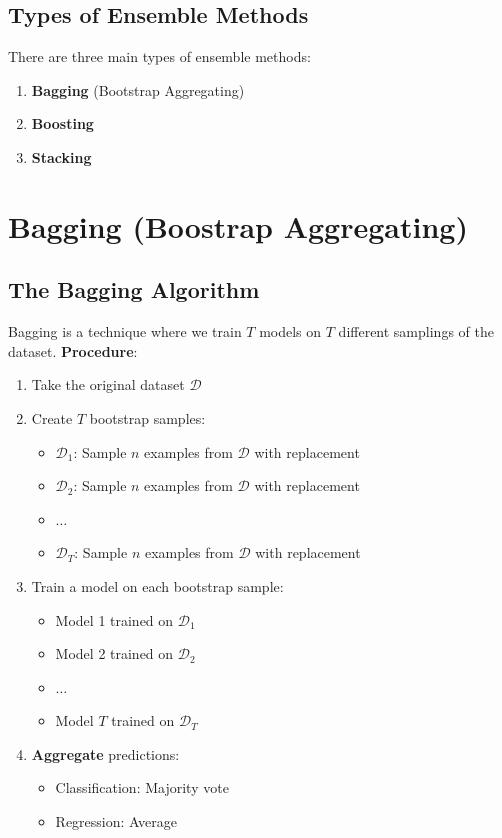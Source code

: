 \documentclass[a4paper]{article}
\theoremstyle{definition}
\begin{document}
\subsection{Types of Ensemble Methods}
There are three main types of ensemble methods:
\begin{enumerate}
    \item \textbf{Bagging} (Bootstrap Aggregating)
    \item \textbf{Boosting}
    \item \textbf{Stacking}
\end{enumerate}
\section{Bagging (Boostrap Aggregating)}
\subsection{The Bagging Algorithm}
Bagging is a technique where we train \( T \) models on \( T \) different samplings of the dataset.
\vspace{1em}
\noindent
\newline
\textbf{Procedure}:
\begin{enumerate}
    \item Take the original dataset \( \mathcal{D} \)   
    \item Create \( T \) bootstrap samples:
    \begin{itemize}
        \item \( \mathcal{D}_1 \): Sample \( n \) examples from \( \mathcal{D} \) with replacement 
        \item \( \mathcal{D}_2 \): Sample \( n \) examples from \( \mathcal{D} \) with replacement 
        \item \( \ldots \)   
        \item \( \mathcal{D}_T \): Sample \( n \) examples from \( \mathcal{D} \) with replacement
    \end{itemize}
    \item Train a model on each bootstrap sample:
    \begin{itemize}
        \item Model 1 trained on \( \mathcal{D}_1 \)    
        \item Model 2 trained on \( \mathcal{D}_2 \)    
        \item \( \ldots \)    
        \item Model \( T \) trained on \( \mathcal{D}_T \)
    \end{itemize}
    \item \textbf{Aggregate} predictions:
    \begin{itemize}
        \item Classification: Majority vote
        \item Regression: Average
    \end{itemize}
\end{enumerate}
\end{document}
